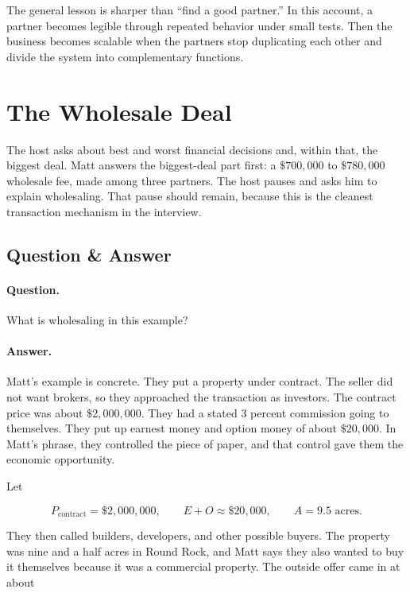 The general lesson is sharper than ``find a good partner.'' In this account, a partner becomes legible through repeated behavior under small tests. Then the business becomes scalable when the partners stop duplicating each other and divide the system into complementary functions.

\section{The Wholesale Deal}

The host asks about best and worst financial decisions and, within that, the biggest deal. Matt answers the biggest-deal part first: a \(\$700{,}000\) to \(\$780{,}000\) wholesale fee, made among three partners. The host pauses and asks him to explain wholesaling. That pause should remain, because this is the cleanest transaction mechanism in the interview.

\subsection{Question \& Answer}

\paragraph{Question.}
What is wholesaling in this example?

\paragraph{Answer.}
Matt's example is concrete. They put a property under contract. The seller did not want brokers, so they approached the transaction as investors. The contract price was about \(\$2{,}000{,}000\). They had a stated 3 percent commission going to themselves. They put up earnest money and option money of about \(\$20{,}000\). In Matt's phrase, they controlled the piece of paper, and that control gave them the economic opportunity.

Let

\begin{equation}
P_{\text{contract}}=\$2{,}000{,}000,
\qquad
E+O\approx \$20{,}000,
\qquad
A=9.5\text{ acres}.
\end{equation}

They then called builders, developers, and other possible buyers. The property was nine and a half acres in Round Rock, and Matt says they also wanted to buy it themselves because it was a commercial property. The outside offer came in at about

